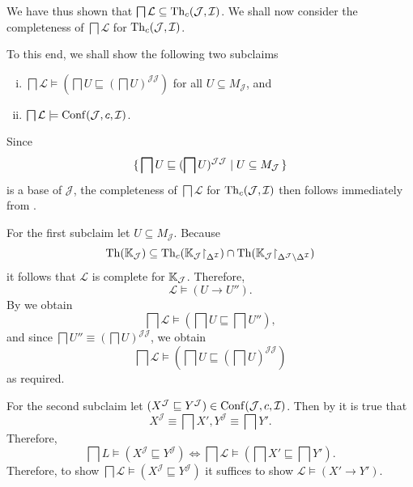 \begin{Proof}
  We have thus shown that $\bigsqcap \mathcal{L} \subseteq \operatorname{Th}_{c}(\mathcal{J},
  \mathcal{I})$.  We shall now consider the completeness of $\bigsqcap \mathcal{L}$ for
  $\operatorname{Th}_{c}(\mathcal{J}, \mathcal{I})$.

  To this end, we shall show the following two subclaims
  \begin{enumerate}[i. ]
  \item $\bigsqcap \mathcal{L} \models (\bigsqcap U \sqsubseteq (\bigsqcap
    U)^{\mathcal{J}\mathcal{J}})$ for all $U \subseteq M_{\mathcal{J}}$, and
  \item $\bigsqcap \mathcal{L} \models \operatorname{Conf}(\mathcal{J}, c, \mathcal{I})$.
  \end{enumerate}
  Since
  \begin{equation*}
    {\ensuremath{\{\, \bigsqcap U \sqsubseteq (\bigsqcap U)^{\mathcal{J}\mathcal{J}} \mid U \subseteq
      M_{\mathcal{J}} \,\}}}
  \end{equation*}
  is a base of $\mathcal{J}$, the completeness of $\bigsqcap \mathcal{L}$ for
  $\operatorname{Th}_{c}(\mathcal{J}, \mathcal{I})$ then follows immediately from
  .

  For the first subclaim let $U \subseteq M_{\mathcal{J}}$.  Because
  \begin{equation*}
    \operatorname{Th}({\mathbb{K}}_{\mathcal{J}}) \subseteq \operatorname{Th}_{c}({\mathbb{K}}_{\mathcal{J}}
    \mathord{\upharpoonright}_{\Delta^{\mathcal{I}}}) \cap \operatorname{Th}({\mathbb{K}}_{\mathcal{J}}
    \mathord{\upharpoonright}_{\Delta^{\mathcal{J}} \setminus \Delta^{\mathcal{I}}})
  \end{equation*}
  it follows that $\mathcal{L}$ is complete for ${\mathbb{K}}_{\mathcal{J}}$.  Therefore,
  \begin{equation*}
    \mathcal{L} \models (U \to U'').
  \end{equation*}
  By  we obtain
  \begin{equation*}
    \bigsqcap \mathcal{L} \models (\bigsqcap U \sqsubseteq \bigsqcap U''),
  \end{equation*}
  and since $\bigsqcap U'' \equiv (\bigsqcap U)^{\mathcal{J}\mathcal{J}}$,  we obtain
  \begin{equation*}
    \bigsqcap \mathcal{L} \models (\bigsqcap U \sqsubseteq (\bigsqcap U)^{\mathcal{J}\mathcal{J}})
  \end{equation*}
  as required.

  For the second subclaim let $(X^{\mathcal{J}} \sqsubseteq Y^{\mathcal{J}}) \in
  \operatorname{Conf}(\mathcal{J}, c, \mathcal{I})$.  Then by  it is
  true that
  \begin{equation*}
    X^{\mathcal{J}} \equiv \bigsqcap X', Y^{\mathcal{J}} \equiv \bigsqcap Y'.
  \end{equation*}
  Therefore,
  \begin{equation}
    \label{eq:51}
    \bigsqcap L \models (X^{\mathcal{J}} \sqsubseteq Y^{\mathcal{J}}) \iff \bigsqcap
    \mathcal{L} \models (\bigsqcap X' \sqsubseteq \bigsqcap Y').
  \end{equation}
  Therefore, to show $\bigsqcap \mathcal{L} \models (X^{\mathcal{J}} \sqsubseteq
  Y^{\mathcal{J}})$ it suffices to show $\mathcal{L} \models (X' \to Y')$.


\end{Proof}

